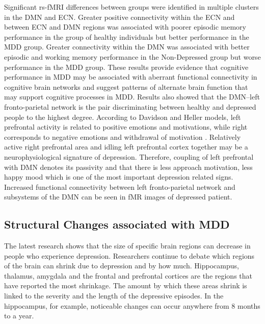 \documentclass[12pt]{article}
\begin{document}
Significant rs-fMRI differences between groups were identified in
multiple clusters in the DMN and ECN. Greater positive connectivity
within the ECN and between ECN and DMN regions was associated with
poorer episodic memory performance in the group of healthy individuals
but better performance in the MDD group. Greater connectivity within
the DMN was associated with better episodic and working memory
performance in the Non-Depressed group but worse performance in the
MDD group. These results provide evidence that cognitive performance
in MDD may be associated with aberrant functional connectivity in
cognitive brain networks and suggest patterns of alternate brain
function that may support cognitive processes in MDD. Results also
showed that the DMN–left fronto-parietal network is the pair
discriminating between healthy and depressed people to the highest
degree. According to Davidson and Heller models, left prefrontal
activity is related to positive emotions and motivations, while right
corresponds to negative emotions and withdrawal of motivation
\cite{model}. Relatively active right prefrontal area and idling left
prefrontal cortex together may be a neurophysiological signature of
depression. Therefore, coupling of left prefrontal with DMN denotes
its passivity and that there is less approach motivation, less happy
mood which is one of the most important depression related
signs. Increased functional connectivity between left fronto-parietal
network and subsystems of the DMN can be seen in fMR images of
depressed patient.

\subsection{Structural Changes associated with MDD}

The latest research \cite{brainvolume} shows that the size of specific
brain regions can decrease in people who experience
depression. Researchers continue to debate which regions of the brain
can shrink due to depression and by how much. Hippocampus, thalamus,
amygdala and the frontal and prefrontal cortices are the regions that
have reported the most shrinkage. The amount by which these areas
shrink is linked to the severity and the length of the depressive
episodes. In the hippocampus, for example, noticeable changes can
occur anywhere from 8 months to a year. \cite{effectMDD}
\end{document}
